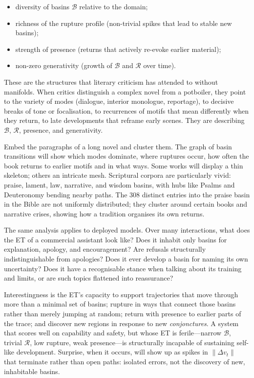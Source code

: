 \documentclass[12pt,a4paper]{article}
\begin{document}
\begin{itemize}
\item diversity of basins $\mathcal{B}$ relative to the domain;
\item richness of the rupture profile (non-trivial spikes that lead to stable new basins);
\item strength of presence (returns that actively re-evoke earlier material);
\item non-zero generativity (growth of $\mathcal{B}$ and $\mathcal{R}$ over time).
\end{itemize}

These are the structures that literary criticism has attended to without manifolds. When critics distinguish a complex novel from a potboiler, they point to the variety of modes (dialogue, interior monologue, reportage), to decisive breaks of tone or focalisation, to recurrences of motifs that mean differently when they return, to late developments that reframe early scenes. They are describing $\mathcal{B}$, $\mathcal{R}$, presence, and generativity.

Embed the paragraphs of a long novel and cluster them. The graph of basin transitions will show which modes dominate, where ruptures occur, how often the book returns to earlier motifs and in what ways. Some works will display a thin skeleton; others an intricate mesh. Scriptural corpora are particularly vivid: praise, lament, law, narrative, and wisdom basins, with hubs like Psalms and Deuteronomy bending nearby paths. The 308 distinct entries into the praise basin in the Bible are not uniformly distributed; they cluster around certain books and narrative crises, showing how a tradition organises its own returns.

The same analysis applies to deployed models. Over many interactions, what does the ET of a commercial assistant look like? Does it inhabit only basins for explanation, apology, and encouragement? Are refusals structurally indistinguishable from apologies? Does it ever develop a basin for naming its own uncertainty? Does it have a recognisable stance when talking about its training and limits, or are such topics flattened into reassurance?

Interestingness is the ET's capacity to support trajectories that move through more than a minimal set of basins; rupture in ways that connect those basins rather than merely jumping at random; return with presence to earlier parts of the trace; and discover new regions in response to new \emph{conjonctures}. A system that scores well on capability and safety, but whose ET is ferile---narrow $\mathcal{B}$, trivial $\mathcal{R}$, low rupture, weak presence---is structurally incapable of sustaining self-like development. Surprise, when it occurs, will show up as spikes in $\|\Delta v_t\|$ that terminate rather than open paths: isolated errors, not the discovery of new, inhabitable basins.
\end{document}
